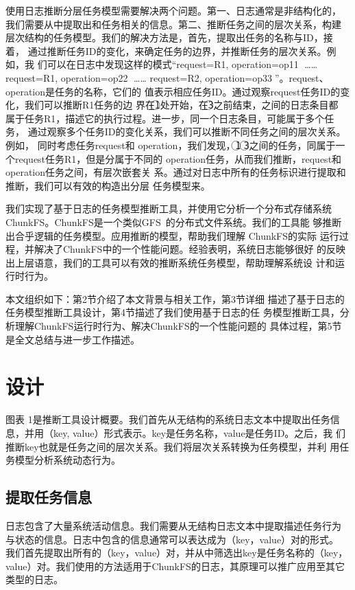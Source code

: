 使用日志推断分层任务模型需要解决两个问题。第一、日志通常是非结构化的，
我们需要从中提取出和任务相关的信息。第二、推断任务之间的层次关系，构建
层次结构的任务模型。我们的解决方法是，首先，提取出任务的名称与ID，接着，
通过推断任务ID的变化，来确定任务的边界，并推断任务的层次关系。例如，我
们可以在日志中发现这样的模式“request=R1, operation=op1\textcircled{1}
……request=R1, operation=op2\textcircled{2} …… request=R2,
operation=op3\textcircled{3}”。request、operation是任务的名称，它们的
值表示相应任务ID。通过观察request任务ID的变化，我们可以推断R1任务的边
界在\textcircled{1}处开始，在\textcircled{3}之前结束，之间的日志条目都
属于任务R1，描述它的执行过程。进一步，同一个日志条目，可能属于多个任务，
通过观察多个任务ID的变化关系，我们可以推断不同任务之间的层次关系。例如，
同时考虑任务request和 operation，我们发现，\textcircled{1}
\textcircled{3}之间的任务，同属于一个request任务R1，但是分属于不同的
operation任务，从而我们推断，request和operation任务之间，有层次嵌套关
系。通过对日志中所有的任务标识进行提取和推断，我们可以有效的构造出分层
任务模型来。

我们实现了基于日志的任务模型推断工具，并使用它分析一个分布式存储系统
ChunkFS。ChunkFS是一个类似GFS~\cite{gfs}的分布式文件系统。我们的工具能
够推断出合乎逻辑的任务模型。应用推断的模型，帮助我们理解 ChunkFS的实际
运行过程，并解决了ChunkFS中的一个性能问题。经验表明，系统日志能够很好
的反映出上层语意，我们的工具可以有效的推断系统任务模型，帮助理解系统设
计和运行时行为。

本文组织如下：第2节介绍了本文背景与相关工作，第3节详细
描述了基于日志的任务模型推断工具设计，第4节描述了我们使用基于日志的任
务模型推断工具，分析理解ChunkFS运行时行为、解决ChunkFS的一个性能问题的
具体过程，第5节是全文总结与进一步工作描述。

\section{设计}

图表 1是推断工具设计概要。我们首先从无结构的系统日志文本中提取出任务信
息，并用（key, value）形式表示。key是任务名称，value是任务ID。之后，我
们推断key也就是任务之间的层次关系。我们将层次关系转换为任务模型，并利
用任务模型分析系统动态行为。

\subsection{提取任务信息}

日志包含了大量系统活动信息。我们需要从无结构日志文本中提取描述任务行为
与状态的信息。日志中包含的信息通常可以表达成为（key，value）对的形式。
我们首先提取出所有的（key，value）对，并从中筛选出key是任务名称的（key，
value）对。我们使用的方法适用于ChunkFS的日志，其原理可以推广应用至其它
类型的日志。

